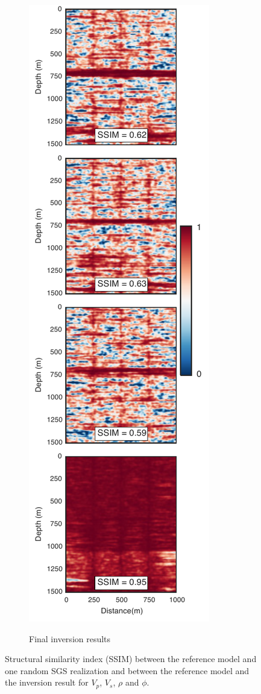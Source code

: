 \begin{figure}[!ht]
\begin{subfigure}[b]{.35\textwidth}
                \label{fig:ssim_a}
        \end{subfigure}%
        \begin{subfigure}[b]{.35\textwidth}
                \caption{Final inversion results}
                \includegraphics[width=\textwidth]{fig/ssim_b.pdf}
                \label{fig:ssim_b}
        \end{subfigure}
        \caption{Structural similarity index (SSIM) between the reference model
and one random SGS realization and between the reference model and the inversion
result for $V_p$, $V_s$, $\rho$ and $\phi$.}
        \label{fig:SSIM}
\end{figure}
